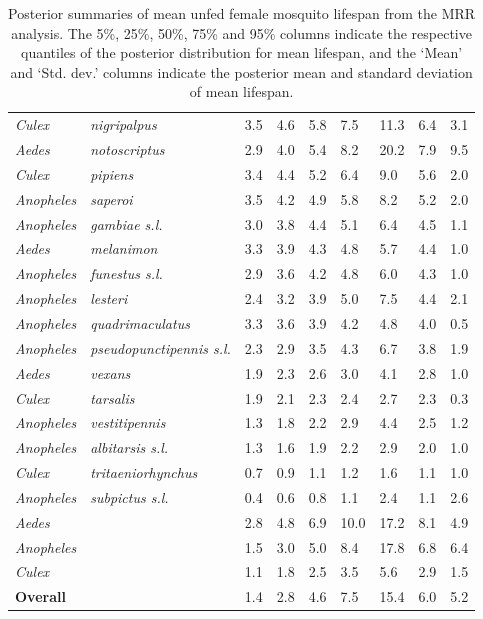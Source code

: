 \documentclass[12pt]{article}
\begin{document}
{\begin{table}[htbp]
\begin{tabular}{l|l|l|l|l|l|l|l|l}
\textit{Culex} & \textit{nigripalpus} & 3.5 & 4.6 & 5.8 & 7.5 & 11.3 & 6.4 & 3.1 \\
\textit{Aedes} & \textit{notoscriptus} & 2.9 & 4.0 & 5.4 & 8.2 & 20.2 & 7.9 & 9.5 \\
\textit{Culex} & \textit{pipiens} & 3.4 & 4.4 & 5.2 & 6.4 & 9.0 & 5.6 & 2.0 \\
\textit{Anopheles} & \textit{saperoi} & 3.5 & 4.2 & 4.9 & 5.8 & 8.2 & 5.2 & 2.0 \\
\textit{Anopheles} & \textit{gambiae s.l.} & 3.0 & 3.8 & 4.4 & 5.1 & 6.4 & 4.5 & 1.1 \\
\textit{Aedes} & \textit{melanimon} & 3.3 & 3.9 & 4.3 & 4.8 & 5.7 & 4.4 & 1.0 \\
\textit{Anopheles} & \textit{funestus s.l.} & 2.9 & 3.6 & 4.2 & 4.8 & 6.0 & 4.3 & 1.0 \\
\textit{Anopheles} & \textit{lesteri} & 2.4 & 3.2 & 3.9 & 5.0 & 7.5 & 4.4 & 2.1 \\
\textit{Anopheles} & \textit{quadrimaculatus} & 3.3 & 3.6 & 3.9 & 4.2 & 4.8 & 4.0 & 0.5 \\
\textit{Anopheles} & \textit{pseudopunctipennis s.l.} & 2.3 & 2.9 & 3.5 & 4.3 & 6.7 & 3.8 & 1.9 \\
\textit{Aedes} & \textit{vexans} & 1.9 & 2.3 & 2.6 & 3.0 & 4.1 & 2.8 & 1.0 \\
\textit{Culex} & \textit{tarsalis} & 1.9 & 2.1 & 2.3 & 2.4 & 2.7 & 2.3 & 0.3 \\
\textit{Anopheles} & \textit{vestitipennis} & 1.3 & 1.8 & 2.2 & 2.9 & 4.4 & 2.5 & 1.2 \\
\textit{Anopheles} & \textit{albitarsis s.l.} & 1.3 & 1.6 & 1.9 & 2.2 & 2.9 & 2.0 & 1.0 \\
\textit{Culex} & \textit{tritaeniorhynchus} & 0.7 & 0.9 & 1.1 & 1.2 & 1.6 & 1.1 & 1.0 \\
\textit{Anopheles} & \textit{subpictus s.l.} & 0.4 & 0.6 & 0.8 & 1.1 & 2.4 & 1.1 & 2.6 \\
\hline
\textit{Aedes} & \text{} & 2.8 & 4.8 & 6.9 & 10.0 & 17.2 & 8.1 & 4.9 \\
\textit{Anopheles} & \text{} & 1.5 & 3.0 & 5.0 & 8.4 & 17.8 & 6.8 & 6.4 \\
\textit{Culex} & \text{} & 1.1 & 1.8 & 2.5 & 3.5 & 5.6 & 2.9 & 1.5 \\
\hline
\textbf{Overall} & \text{} & 1.4 & 2.8 & 4.6 & 7.5 & 15.4 & 6.0 & 5.2 \\
\end{tabular}
\caption{Posterior summaries of mean unfed female mosquito lifespan from the MRR analysis. The 5\%, 25\%, 50\%, 75\% and 95\% columns indicate the respective quantiles of the posterior distribution for mean lifespan, and the `Mean' and `Std. dev.' columns indicate the posterior mean and standard deviation of mean lifespan.}
\label{tab:mrr_estimated_lifespans}%
\end{table}%


}
\end{document}
